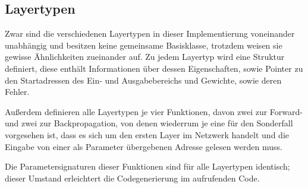 \documentclass[../main.tex]{subfiles}
\begin{document}
\subsection{Layertypen}
Zwar sind die verschiedenen Layertypen in dieser Implementierung voneinander unabhängig und besitzen keine gemeinsame Basisklasse, trotzdem weisen sie gewisse Ähnlichkeiten zueinander auf. Zu jedem Layertyp wird eine Struktur definiert, diese enthält Informationen über dessen Eigenschaften, sowie Pointer zu den Startadressen des Ein- und Ausgabebereichs und Gewichte, sowie deren Fehler. 

Außerdem definieren alle Layertypen je vier Funktionen, davon zwei zur Forward- und zwei zur Backpropagation, von denen wiederrum je eine für den Sonderfall vorgesehen ist, dass es sich um den ersten Layer im Netzwerk handelt und die Eingabe von einer als Parameter übergebenen Adresse gelesen werden muss. 

Die Parametersignaturen dieser Funktionen sind für alle Layertypen identisch; dieser Umstand erleichtert die Codegenerierung im aufrufenden Code. 
\end{document}
